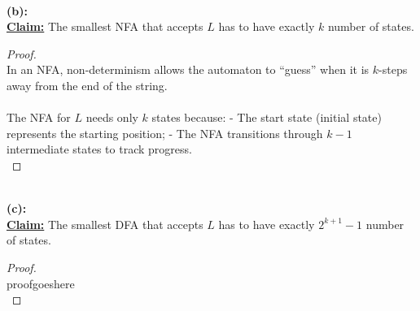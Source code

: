 \documentclass[12pt]{article}
\begin{document}
\leavevmode\\
\textbf{(b):} \\
\textbf{\underline{Claim:}} The smallest NFA that accepts $L$ has to have exactly $k$ number of states.
\begin{proof}
\leavevmode\\
    In an NFA, non-determinism allows the automaton to ``guess'' when it is $k$-steps away from the end of the string. \\
    \\
    The NFA for $L$ needs only $k$ states because:
    - The start state (initial state) represents the starting position;
    - The NFA transitions through $k - 1$ intermediate states to track progress. \\
\end{proof}
\leavevmode\\
\textbf{(c):} \\
\textbf{\underline{Claim:}} The smallest DFA that accepts $L$ has to have exactly $2^{k + 1} - 1$ number of states.
\begin{proof}
\leavevmode\\
    proofgoeshere \\
\end{proof}
\leavevmode\\
\pagebreak
\end{document}
